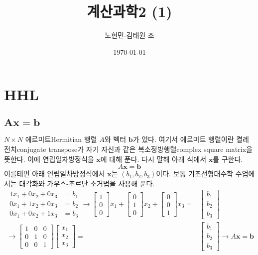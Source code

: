 \documentclass[a4paper,atbegshi,chapter,itemph,hidelinks]{oblivoir}
\title{계산과학2 (1)}
\author{노현민-김태원 조}
\date{\today}
\begin{document}
\maketitle
\tableofcontents
\chapter{HHL}
\section{$\pmb{Ax=b}$}
$N\times N$ 에르미트{\footnotesize Hermitian} 행렬 $A$와 벡터 $\mathbf{b}$가 
있다. 여기서 에르미트 행렬이란 켤레전치{\footnotesize conjugate transpose}가
자기 자신과 같은 복소정방행렬{\footnotesize complex square matrix}을 뜻한다. 이에 
연립일차방정식을 $\mathbf{x}$에 대해 푼다. 다시 말해 아래 식에서
$\mathbf{x}$를 구한다.
\[
  A\mathbf{x}=\mathbf{b}
\]
이를테면 아래 연립일차방정식에서 $\mathbf{x}$는 $(b_1,b_2,b_3)$이다. 보통
기초선형대수학 수업에서는 대각화와 가우스-조르단 소거법을 사용해 푼다.
\begin{align*}
  \begin{matrix}
  1x_1+0x_2+0x_3 &= b_1 \\
  0x_1+1x_2+0x_3 &= b_2\\
  0x_1+0x_2+1x_3 &= b_3
\end{matrix}\longrightarrow
\begin{bmatrix}
  1\\0\\0
\end{bmatrix}x_1+
\begin{bmatrix}
  0\\1\\0
\end{bmatrix}x_2+
\begin{bmatrix}
  0\\0\\1
\end{bmatrix}x_3=&
\begin{bmatrix}
  b_1\\b_2\\b_3
\end{bmatrix}
  \\\longrightarrow
\begin{bmatrix}
  1&0&0\\0&1&0\\0&0&1
\end{bmatrix}
\begin{bmatrix}x_1\\x_2\\x_3\end{bmatrix}
  =&\begin{bmatrix}b_1\\b_2\\b_3\end{bmatrix}\longrightarrow
  A\mathbf{x}=\mathbf{b}
\end{align*}
\end{document}
